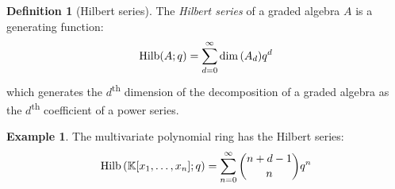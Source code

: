 \documentclass[svgnames]{article}
\theoremstyle{definition}
\newtheorem{Definition}{Definition}
\newtheorem*{Example*}{Example}
\theoremstyle{remark}
\theoremstyle{underline}
\theoremstyle{underline}
\DeclareMathOperator{\Hilb}{Hilb}
\renewcommand{\th}{\textsuperscript{th}\xspace}
\begin{document}
	\begin{Definition}[Hilbert series]
		The \emph{Hilbert series} of a graded algebra $A$ is a generating function:
		\begin{gather*}
			\Hilb(A; q) = \sum_{d=0}^{\infty} \dim\pqty{A_d} q^d
		\end{gather*}
		which generates the $d$\th dimension of the decomposition of a graded algebra as the $d$\th coefficient of a power series.
	\end{Definition}

	\begin{Example*}
		The multivariate polynomial ring has the Hilbert series:
		\begin{gather*}
			\Hilb\pqty{\mathbb K[x_1,\ldots, x_n]; q} = \sum_{n=0}^{\infty} \binom{n + d - 1}{n} q^n
		\end{gather*}
	\end{Example*}
\end{document}
